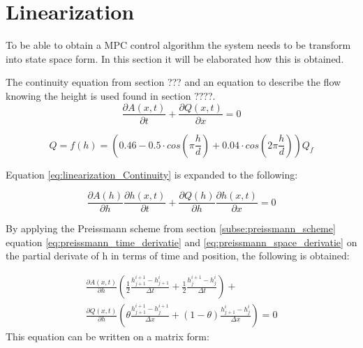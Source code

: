 \section{Linearization}\label{se:linearization}
To be able to obtain a MPC control algorithm the system needs to be transform into state space form. In this section it will be elaborated how this is obtained.


The continuity equation from section ??? and an equation to describe the flow knowing the height is used found in section ????. 
\begin{equation}\label{eq:linearization_Continuity}
\frac{\partial A(x,t)}{\partial t} + \frac{\partial Q(x,t)}{\partial x}=0
\end{equation}

\begin{equation}
	Q = f(h) = \left(0.46-0.5 \cdot cos\left(\pi \frac{h}{d}\right)+0.04\cdot cos\left(2\pi\frac{h}{d}\right)\right)Q_f
\end{equation}

Equation \ref{eq:linearization_Continuity} is expanded to the following:

\begin{equation}
	\frac{\partial A(h)}{\partial h}\frac{\partial h(x,t)}{\partial t} + \frac{\partial Q(h)}{\partial h}\frac{\partial h(x,t)}{\partial x}=0
\end{equation}

By applying the Preissmann scheme from section \ref{subse:preissmann_scheme} equation \ref{eq:preissmann_time_derivatie} and \ref{eq:preissmann_space_derivatie} on the partial derivate of h in terms of time and position, the following is obtained: 

\begin{multline}
	\frac{\partial A(x,t)}{\partial h} \left(\frac{1}{2}\frac{h_{j+1}^{i+1}-h_{j+1}^i}{\Delta t} +  \frac{1}{2} \frac{h_{j}^{i+1} - h_j^i}{\Delta t}\right) + \\ \frac{\partial Q(x,t)}{\partial h}\left(\theta \frac{h_{j+1}^{i+1}-h_j^{i+1}}{\Delta x}+(1-\theta)\frac{h_{j+1}^i - h_j^i}{\Delta x}\right)=0
\end{multline}
This equation can be written on a matrix form:

